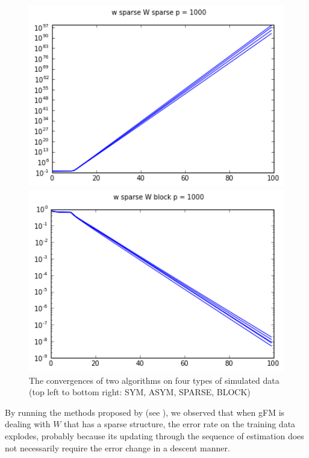 \documentclass{article}
\begin{document}
\begin{figure}[htbp]
\begin{minipage}{0.24\textwidth}
    \centering
    \includegraphics[width=1\textwidth]{gfm_plots/w_sparse_W_lowrank_sparse}
  \end{minipage}
  \hfill
  \begin{minipage}{0.24\textwidth}
    \centering
    \includegraphics[width=1\textwidth]{gfm_plots/w_sparse_W_block}
  \end{minipage}
  \caption{The convergences of two algorithms on four types of simulated data (top left to bottom right: SYM, ASYM, SPARSE, BLOCK)}
  \label{fig:gfm}
\end{figure}

By running the methods proposed by \cite{generalizedFM_paper} (see ), we observed that when gFM is dealing with $W$ that has a sparse structure, the error rate on the training data explodes, probably because its updating through the sequence of estimation does not necessarily require the error change in a descent manner.
\end{document}
